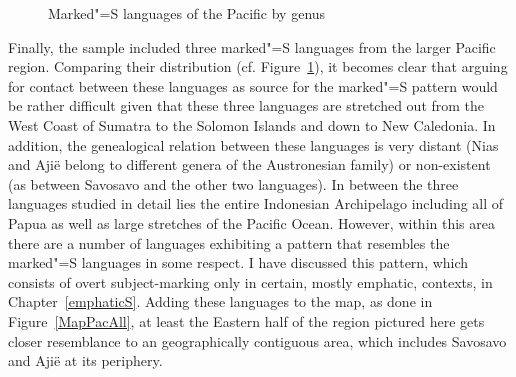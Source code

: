 \begin{figure}[h,t,b] \centering {}\caption{Marked"=S languages of the Pacific by genus}\label{MapPac}
\end{figure}

Finally, the sample included three marked"=S languages from the larger Pacific region. 
\enlargethispage{\baselineskip}
Comparing their distribution (cf. Figure~\ref{MapPac}), it becomes clear that arguing for contact between these languages as source for the marked"=S pattern would be rather difficult given that these three languages are stretched out from the West Coast of Sumatra to the Solomon Islands and down to New Caledonia. 
In addition, the genealogical relation between these languages is very distant (Nias and Aji\"e belong to different genera of the Austronesian family) or non-existent (as between Savosavo and the other two languages). 
In between the three languages studied in detail lies the entire Indonesian Archipelago including all of Papua as well as large stretches of the Pacific Ocean.
However, within this area there are a number of languages exhibiting a pattern that resembles the marked"=S languages in some respect. 
I have discussed this pattern, which consists of overt subject-marking only in certain, mostly emphatic, contexts, in Chapter~\ref{emphaticS}.
Adding these languages to the map, as done in Figure~\ref{MapPacAll}, at least the Eastern half of the region pictured here gets closer resemblance to an geographically contiguous area, which includes Savosavo and Aji\"e at its periphery. 

